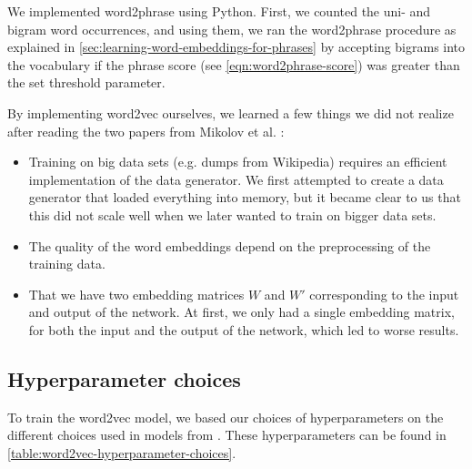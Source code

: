 We implemented word2phrase using Python. First, we counted the uni- and bigram word occurrences, and using them, we ran the word2phrase procedure as explained in \cref{sec:learning-word-embeddings-for-phrases} by accepting bigrams into the vocabulary if the phrase score (see \cref{eqn:word2phrase-score}) was greater than the set threshold parameter.

By implementing word2vec ourselves, we learned a few things we did not realize after reading the two papers from Mikolov et al. \cite{mikolov2013a, mikolov2013b}:
\begin{itemize}
    \item Training on big data sets (e.g. dumps from Wikipedia) requires an efficient implementation of the data generator. We first attempted to create a data generator that loaded everything into memory, but it became clear to us that this did not scale well when we later wanted to train on bigger data sets.
    \item The quality of the word embeddings depend on the preprocessing of the training data.
    \item That we have two embedding matrices $W$ and $W'$ corresponding to the input and output of the network. At first, we only had a single embedding matrix, for both the input and the output of the network, which led to worse results.
\end{itemize}

\subsection{Hyperparameter choices}
\label{sec:word2vec-hyperparameter-choices}
To train the word2vec model, we based our choices of hyperparameters on the different choices used in models from \cite{mikolov2013a, mikolov2013b}. These hyperparameters can be found in \cref{table:word2vec-hyperparameter-choices}.

